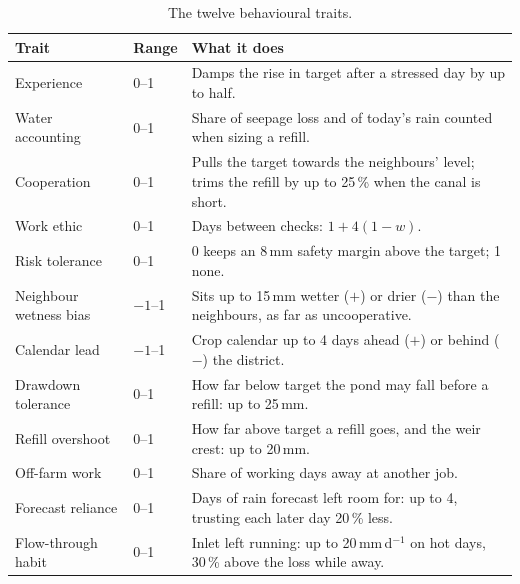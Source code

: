 \documentclass[11pt]{article}
\begin{document}
\begin{table}[H]
\centering\small
\begin{tabular}{L{3.1cm}L{1.2cm}L{10.8cm}}
\toprule
\textbf{Trait} & \textbf{Range} & \textbf{What it does} \\ \midrule
Experience & 0--1 & Damps the rise in target after a stressed day by up to half. \\
Water accounting & 0--1 & Share of seepage loss and of today's rain counted when sizing a refill. \\
Cooperation & 0--1 & Pulls the target towards the neighbours' level; trims the refill by up to 25\,\% when the canal is short. \\
Work ethic & 0--1 & Days between checks: $1 + 4(1 - w)$. \\
Risk tolerance & 0--1 & 0 keeps an 8\,mm safety margin above the target; 1 none. \\
Neighbour wetness bias & $-1$--1 & Sits up to 15\,mm wetter ($+$) or drier ($-$) than the neighbours, as far as uncooperative. \\
Calendar lead & $-1$--1 & Crop calendar up to 4 days ahead ($+$) or behind ($-$) the district. \\
Drawdown tolerance & 0--1 & How far below target the pond may fall before a refill: up to 25\,mm. \\
Refill overshoot & 0--1 & How far above target a refill goes, and the weir crest: up to 20\,mm. \\
Off-farm work & 0--1 & Share of working days away at another job. \\
Forecast reliance & 0--1 & Days of rain forecast left room for: up to 4, trusting each later day 20\,\% less. \\
Flow-through habit & 0--1 & Inlet left running: up to 20\,mm\,d$^{-1}$ on hot days, 30\,\% above the loss while away. \\
\bottomrule
\end{tabular}
\caption{The twelve behavioural traits.}
\label{tab:traits}
\end{table}
\end{document}
